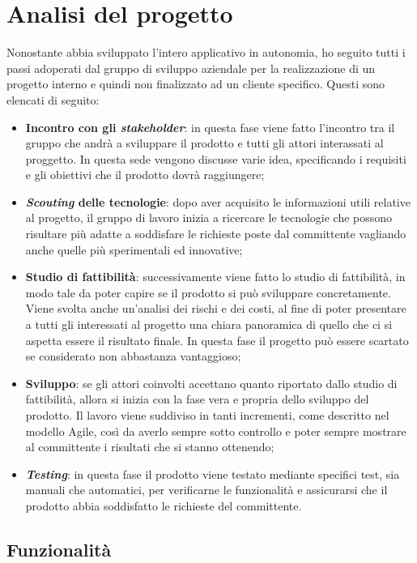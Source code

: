 \section{Analisi del progetto}
Nonostante abbia sviluppato l'intero applicativo in autonomia, ho seguito tutti i passi adoperati dal gruppo di sviluppo aziendale per la realizzazione
di un progetto interno e quindi non finalizzato ad un cliente specifico.
Questi sono elencati di seguito:
\begin{itemize}
    \item \textbf{Incontro con gli \emph{stakeholder}}: in questa fase viene fatto l’incontro tra il gruppo che andrà a sviluppare il prodotto e tutti 
    gli attori interassati al proggetto. In questa sede vengono discusse varie idea, specificando i requisiti e gli obiettivi che il prodotto dovrà 
    raggiungere;
    \item \textbf{\emph{Scouting} delle tecnologie}: dopo aver acquisito le informazioni utili relative al progetto, il gruppo di lavoro inizia a ricercare 
    le tecnologie che possono risultare più adatte a soddisfare le richieste poste dal committente vagliando anche quelle più sperimentali ed innovative;
    \item \textbf{Studio di fattibilità}: successivamente viene fatto lo studio di fattibilità, in modo tale da poter capire se il prodotto si può sviluppare 
    concretamente. Viene svolta anche un’analisi dei rischi e dei costi, al fine di poter presentare a tutti gli interessati al progetto una chiara panoramica
    di quello che ci si aspetta essere il risultato finale. In questa fase il progetto può essere scartato se considerato non abbastanza vantaggioso;
    \item \textbf{Sviluppo}: se gli attori coinvolti accettano quanto riportato dallo studio di fattibilità, allora si inizia con la fase vera 
    e propria dello sviluppo del prodotto. 
    Il lavoro viene suddiviso in tanti incrementi, come descritto nel modello Agile, così da averlo sempre sotto controllo e poter sempre mostrare 
    al committente i risultati che si stanno ottenendo;
    \item \textbf{\emph{Testing}}: in questa fase il prodotto viene testato mediante specifici test, sia manuali che automatici, per verificarne le 
    funzionalità e assicurarsi che il prodotto abbia soddisfatto le richieste del committente.
\end{itemize}

\subsection{Funzionalità}
